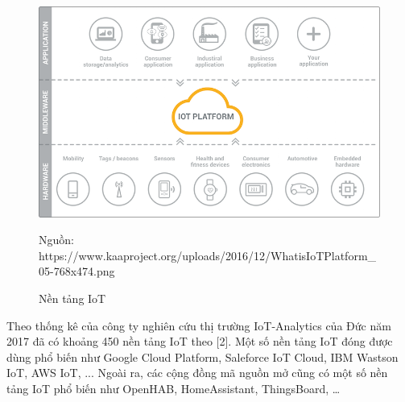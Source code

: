 \begin{figure}[h!]
	\center
	\includegraphics[scale=0.6]{image/IoTPlatform}
	\caption{Nền tảng IoT}
	Nguồn: https://www.kaaproject.org/uploads/2016/12/WhatisIoTPlatform\_05-768x474.png
	\label{fig:iot-platform}
\end{figure}


Theo thống kê của công ty nghiên cứu thị trường IoT-Analytics của Đức năm 2017 đã có khoảng 450 nền tảng IoT theo [2]. Một số nền tảng IoT đóng được dùng phổ biến như Google Cloud Platform, Saleforce IoT Cloud, IBM Wastson IoT, AWS IoT, ... Ngoài ra, các cộng đồng mã nguồn mở cũng có một số nền tảng IoT phổ biến như OpenHAB, HomeAssistant, ThingsBoard, …


